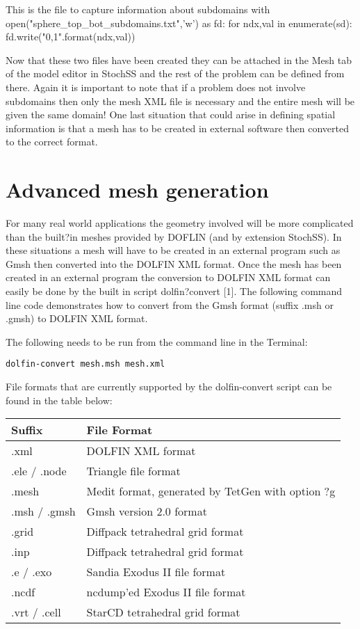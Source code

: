 \begin{ipythonnb}
\ampersand This is the file to capture information about subdomains
with open("sphere_top_bot_subdomains.txt",'w') as fd:
	for ndx,val in enumerate(sd):
		fd.write("{0},{1}\n".format(ndx,val))
\end{ipythonnb}
Now that these two files have been created they can be attached in the Mesh tab of the model editor in StochSS and the
rest of the problem can be defined from there. Again it is important to note that if a problem does not involve subdomains
then only the mesh XML file is necessary and the entire mesh will be given the same domain! One last situation that could
arise in defining spatial information is that a mesh has to be created in external software then converted to the correct
format.

\section{Advanced mesh generation}

For many real world applications the geometry involved will be more complicated than the built?in meshes provided by
DOFLIN (and by extension StochSS). In these situations a mesh will have to be created in an external program such as
Gmsh then converted into the DOLFIN XML format. Once the mesh has been created in an external program the
conversion to DOLFIN XML format can easily be done by the built in script dolfin?convert [1]. The following command line
code demonstrates how to convert from the Gmsh format (suffix .msh or .gmsh) to DOLFIN XML format.

The following needs to be run from the command line in the Terminal:
\begin{verbatim}
dolfin-convert mesh.msh mesh.xml
\end{verbatim}

File formats that are currently supported by the dolfin-convert script can be found in the table below:

\begin{table}[htp]
   \begin{tabular}{| l | l |} %
   \toprule
      Suffix   & File Format\\
      \midrule
     .xml & DOLFIN XML format\\
     .ele / .node & Triangle file format\\
     .mesh & Medit format, generated by TetGen with option ?g\\
     .msh / .gmsh & Gmsh version 2.0 format\\
     .grid & Diffpack tetrahedral grid format\\
     .inp & Diffpack tetrahedral grid format\\
     .e / .exo & Sandia Exodus II file format\\
     .ncdf & ncdump'ed Exodus II file format\\
     .vrt / .cell & StarCD tetrahedral grid format\\
     \bottomrule
   \end{tabular}
   \end{table}



